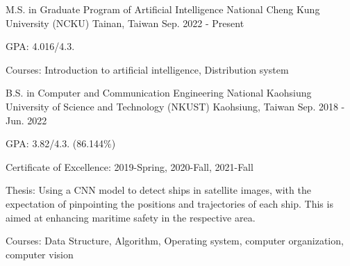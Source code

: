 
\vspace{-2mm}

\begin{cventries}

  
\cventry
  {M.S. in Graduate Program of Artificial Intelligence} %
  {National Cheng Kung University (NCKU)} %
  {Tainan, Taiwan} %
  {Sep. 2022 - Present} %
  {
    \begin{cvitems} %
      \item {GPA: 4.016/4.3.}
      \item {Courses: Introduction to artificial intelligence, Distribution system}
    \end{cvitems}
  }

  \vspace{-2mm}

  \cventry
    {B.S. in Computer and Communication Engineering} %
    {National Kaohsiung University of Science and Technology (NKUST)} %
    {Kaohsiung, Taiwan} %
    {Sep. 2018 - Jun. 2022} %
    {
      \begin{cvitems} %
        \item {GPA: 3.82/4.3. (86.144$\%$)} 
        \item {Certificate of Excellence: 2019-Spring, 2020-Fall, 2021-Fall}
        \item {Thesis: Using a CNN model to detect ships in satellite images, with the expectation of pinpointing the positions and trajectories of each ship. This is aimed at enhancing maritime safety in the respective area.
        }
        \item {Courses: Data Structure, Algorithm, Operating system, computer organization, computer vision}
      \end{cvitems}
    }

\end{cventries}
